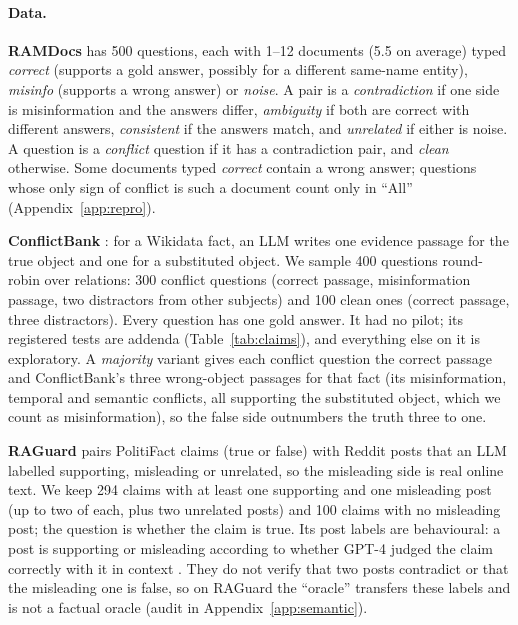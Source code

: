 \paragraph{Data.}
\textbf{RAMDocs} \citep{wang2025madam} has 500 questions, each with 1--12 documents (5.5 on average) typed
\emph{correct} (supports a gold answer, possibly for a different same-name entity), \emph{misinfo} (supports a wrong
answer) or \emph{noise}. A pair is a \emph{contradiction} if one side is misinformation and the answers differ,
\emph{ambiguity} if both are correct with different answers, \emph{consistent} if the answers match, and
\emph{unrelated} if either is noise. A question is a \emph{conflict} question if it has a contradiction pair, and
\emph{clean} otherwise. Some documents typed \emph{correct} contain a wrong answer; questions whose only sign of
conflict is such a document count only in ``All'' (Appendix~\ref{app:repro}).

\textbf{ConflictBank} \citep{su2024conflictbank}: for a Wikidata fact, an LLM writes one evidence passage for the true
object and one for a substituted object. We sample 400 questions round-robin over relations: 300 conflict questions
(correct passage, misinformation passage, two distractors from other subjects) and 100 clean ones (correct passage,
three distractors). Every question has one gold answer. It had no pilot; its registered tests are addenda (Table~\ref{tab:claims}), and everything else on it is exploratory. A
\emph{majority} variant gives each conflict question the correct passage and ConflictBank's three wrong-object
passages for that fact (its misinformation, temporal and semantic conflicts, all supporting the substituted object,
which we count as misinformation), so the false side outnumbers the truth three to one.

\textbf{RAGuard} \citep{zeng2025raguard} pairs PolitiFact claims (true or false) with Reddit posts that an LLM
labelled supporting, misleading or unrelated, so the misleading side is real online text. We keep 294 claims with at
least one supporting and one misleading post (up to two of each, plus two unrelated posts) and 100 claims with no
misleading post; the question is whether the claim is true. Its post labels are behavioural: a post is supporting or misleading according to whether GPT-4 judged the claim correctly with it in context \citep[\S3.3]{zeng2025raguard}. They do not verify that two posts contradict or that the misleading one is false, so on RAGuard the ``oracle'' transfers these labels and is not a factual oracle (audit in Appendix~\ref{app:semantic}).

